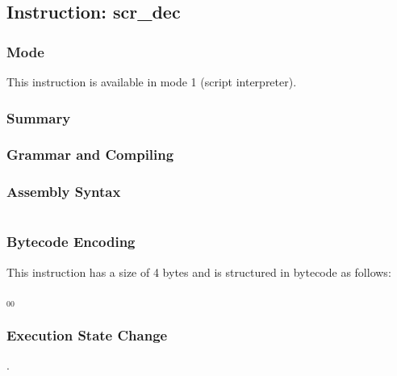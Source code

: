 \subsection{Instruction: scr\_dec}

\subsubsection{Mode}
This instruction is available in mode 1 (script interpreter).
\subsubsection{Summary}


\subsubsection{Grammar and Compiling}


\subsubsection{Assembly Syntax}

\begin{myquote}
\begin{verbatim}

\end{verbatim}
\end{myquote}

\subsubsection{Bytecode Encoding}

This instruction has a size of 4 bytes and is structured in bytecode as follows:

$_{00}$\ 


\subsubsection{Execution State Change}

.


